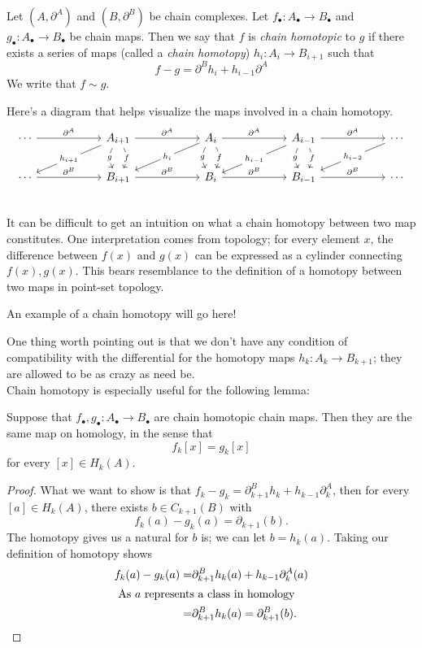 \begin{definition} Let $(A,\partial^A)$ and $(B, \partial^B)$ be chain complexes. Let $f_\bullet:A_\bullet\to B_\bullet$ and $g_\bullet:A_\bullet \to B_\bullet$ be chain maps. Then we say that $f$ is \emph{chain homotopic} to $g$ if there exists a series of maps (called a \emph{chain homotopy}) $h_i:A_i\to B_{i+1}$ such that $$f-g=\partial^B h_{i}+h_{i-1}\partial^A$$ We write that $f\sim g$. \end{definition}

Here's a diagram that helps visualize the maps involved in a chain homotopy.
\[\begin{tikzcd}[column sep=2cm]
\cdots \arrow{r}{\partial^A} & A_{i+1}\arrow[bend left]{d}[description]{f} \arrow[bend right]{d}[description]{g}\arrow{dl}[description]{h_{i+1}} \arrow{r}{\partial^A} & A_{i}\arrow[bend left]{d}[description]{f} \arrow[bend right]{d}[description]{g}\arrow{dl}[description]{h_{i}} \arrow{r}{\partial^A}& A_{i-1} \arrow[bend left]{d}[description]{f} \arrow[bend right]{d}[description]{g}\arrow{dl}[description]{h_{i-1}}\arrow{r}{\partial^A}& \cdots \arrow{dl}[description]{h_{i-2}}\\
\cdots \arrow{r}{\partial^B} & B_{i+1} \arrow{r}{\partial^B} & B_{i} \arrow{r}{\partial^B}& B_{i-1} \arrow{r}{\partial^B}& \cdots \\
\end{tikzcd}\]
It can be difficult to get an intuition on what a chain homotopy between two map constitutes. One interpretation comes from topology; for every element $x$, the difference between $f(x)$ and $g(x)$ can be expressed as a cylinder connecting $f(x), g(x)$. This bears resemblance to the definition of a homotopy between two maps in point-set topology. \\
\begin{example} An example of a chain homotopy will go here!
\end{example}
One thing worth pointing out is that we don't have any condition of compatibility with the differential for the homotopy maps $h_k:A_k\to B_{k+1}$; they are allowed to be as crazy as need be. \\
Chain homotopy is especially useful for the following lemma:
\begin{lemma}
Suppose that $f_\bullet, g_\bullet: A_\bullet\to B_\bullet$ are chain homotopic chain maps. Then they are the same map on homology, in the sense that 
\[f_k[x]=g_k[x]\]
for every $[x]\in H_k(A). $
\end{lemma}
\begin{proof}
What we want to show is that $f_k-g_k= \partial^B_{k+1} h_{k}+h_{k-1}\partial^A_k$, then for every $[a]\in H_k(A)$, there exists $b\in C_{k+1}(B)$ with 
\[f_k(a)-g_k(a)=\partial_{k+1}(b).\]
The homotopy gives us a natural for $b$ is; we can let $b=h_k(a)$. Taking our definition of homotopy shows 
\begin{align*}f_k(a)-g_k(a)=&\partial^B_{k+1} h_{k}(a)+h_{k-1}\partial^A_k(a)\\
\intertext{ As $a$ represents a class in homology} 
=& \partial^B_{k+1} h_{k}(a)= \partial^B_{k+1}(b). \end{align*}
\end{proof}


